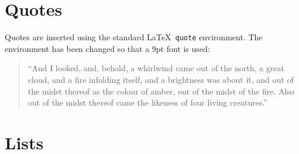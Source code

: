 
\section{Quotes}
\label{sec:Quotes} %

Quotes are inserted using the standard \LaTeX\ \texttt{quote}
environment. The environment has been changed so that a 9pt font is
used:

\begin{quote}
  ``And I looked, and, behold, a whirlwind came out of the north, a
  great cloud, and a fire infolding itself, and a brightness was about
  it, and out of the midst thereof as the colour of amber, out of the
  midst of the fire. Also out of the midst thereof came the likeness
  of four living creatures.''
\end{quote}

\section{Lists}
\label{sec:lists}

